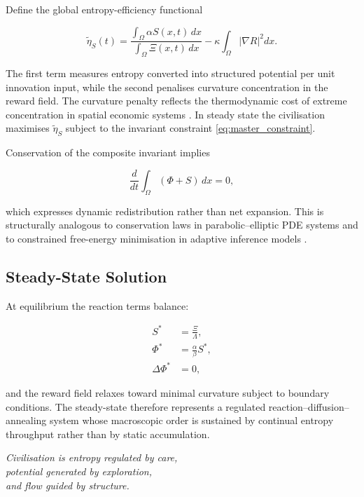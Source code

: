 \documentclass[12pt,a4paper]{article}
\theoremstyle{definition}
\begin{document}
Define the global entropy-efficiency functional

\begin{equation}
  \tilde{\eta}_S(t)
  =
  \frac{
    \int_\Omega \alpha S(x,t)\, dx
  }{
    \int_\Omega \Xi(x,t)\, dx
  }
  -
  \kappa \int_\Omega |\nabla R|^2 dx.
  \label{eq:master_eta}
\end{equation}

The first term measures entropy converted into structured potential per
unit innovation input, while the second penalises curvature concentration
in the reward field.  The curvature penalty reflects the thermodynamic
cost of extreme concentration in spatial economic systems
\citep{georgescu1971,dalziel2018}.  In steady state the civilisation
maximises $\tilde{\eta}_S$ subject to the invariant constraint
\eqref{eq:master_constraint}.

Conservation of the composite invariant implies

\begin{equation}
  \frac{d}{dt}
  \int_\Omega
  (\Phi + S)\,dx
  = 0,
\end{equation}

which expresses dynamic redistribution rather than net expansion.
This is structurally analogous to conservation laws in parabolic–elliptic
PDE systems \citep{evans2010} and to constrained free-energy
minimisation in adaptive inference models \citep{friston2023}.

\subsection{Steady-State Solution}

At equilibrium the reaction terms balance:

\begin{align}
  S^* &= \frac{\Xi}{\Lambda}, \\
  \Phi^* &= \frac{\alpha}{\beta} S^*, \\
  \Delta \Phi^* &= 0,
\end{align}

and the reward field relaxes toward minimal curvature subject to boundary
conditions.  The steady-state therefore represents a regulated
reaction–diffusion–annealing system whose macroscopic order is sustained
by continual entropy throughput rather than by static accumulation.

\medskip
\begin{center}
  \itshape
  Civilisation is entropy regulated by care,\\
  potential generated by exploration,\\
  and flow guided by structure.
\end{center}
\end{document}
